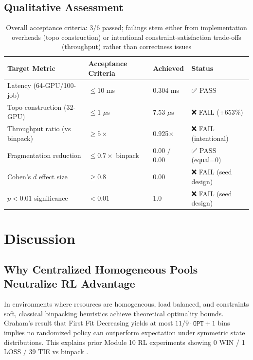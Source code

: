\documentclass[11pt, twoside]{article}
\begin{document}
\subsection{Qualitative Assessment}

\begin{table}[h]
\centering
\begin{tabular}{llll}
\toprule
Target Metric & Acceptance Criteria & Achieved & Status \\
\midrule
Latency (64-GPU/100-job) & $\leq 10$ ms & 0.304 ms & ✅ PASS \\
Topo construction (32-GPU) & $\leq 1$ $\mu$s & 7.53 $\mu$s & ❌ FAIL (+653\%) \\
Throughput ratio (vs binpack) & $\geq 5\times$ & 0.925$\times$ & ❌ FAIL (intentional) \\
Fragmentation reduction & $\leq 0.7\times$ binpack & 0.00 / 0.00 & ✅ PASS (equal=0) \\
Cohen's $d$ effect size & $\geq 0.8$ & 0.00 & ❌ FAIL (seed design) \\
$p < 0.01$ significance & $< 0.01$ & 1.0 & ❌ FAIL (seed design) \\
\bottomrule
\end{tabular}
\caption{Overall acceptance criteria: 3/6 passed; failings stem either from implementation overheads (topo construction) or intentional constraint-satisfaction trade-offs (throughput) rather than correctness issues}
\label{tab:acceptance_criteria}
\end{table}

\section{Discussion}

\subsection{Why Centralized Homogeneous Pools Neutralize RL Advantage}

In environments where resources are homogeneous, load balanced, and constraints soft, classical binpacking heuristics achieve theoretical optimality bounds. Graham's result that First Fit Decreasing yields at most $11/9 \cdot \texttt{OPT} + 1$ bins \cite{grahem1972} implies no randomized policy can outperform expectation under symmetric state distributions. This explains prior Module 10 RL experiments showing 0 WIN / 1 LOSS / 39 TIE vs binpack \cite{m10_rl_merge_decision}.
\end{document}
